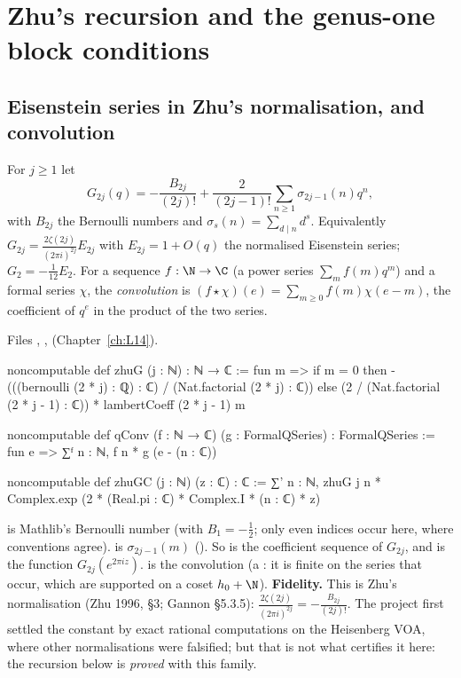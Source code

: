 \section{Zhu's recursion and the genus-one block conditions}\label{l15:sec:recursion}

\subsection{Eisenstein series in Zhu's normalisation, and convolution}

\begin{definition}\label{l15:def:zhuG}
For $j\ge1$ let
\begin{equation*}
  G_{2j}(q)=-\frac{B_{2j}}{(2j)!}+\frac{2}{(2j-1)!}\sum_{n\ge1}\sigma_{2j-1}(n)q^n,
\end{equation*}
with $B_{2j}$ the Bernoulli numbers and $\sigma_s(n)=\sum_{d\mid n}d^s$. Equivalently $G_{2j}=\frac{2\zeta(2j)}{(2\pi i)^{2j}}E_{2j}$
with $E_{2j}=1+O(q)$ the normalised Eisenstein series; $G_2=-\frac1{12}E_2$. For a sequence $f:\N\to\C$ (a power series
$\sum_m f(m)q^m$) and a formal series $\chi$, the \emph{convolution} is $(f\star\chi)(e)=\sum_{m\ge0}f(m)\chi(e-m)$, the
coefficient of $q^e$ in the product of the two series.
\end{definition}
\noindent Files ,
, 
(Chapter~\ref{ch:L14}).
\begin{leancode}
noncomputable def zhuG (j : ℕ) : ℕ → ℂ :=
  fun m =>
    if m = 0 then -(((bernoulli (2 * j) : ℚ) : ℂ) / (Nat.factorial (2 * j) : ℂ))
    else (2 / (Nat.factorial (2 * j - 1) : ℂ)) * lambertCoeff (2 * j - 1) m

noncomputable def qConv (f : ℕ → ℂ) (g : FormalQSeries) : FormalQSeries :=
  fun e => ∑ᶠ n : ℕ, f n * g (e - (n : ℂ))

noncomputable def zhuGC (j : ℕ) (z : ℂ) : ℂ :=
  ∑' n : ℕ, zhuG j n * Complex.exp (2 * (Real.pi : ℂ) * Complex.I * (n : ℂ) * z)
\end{leancode}

\begin{dictionary}
 is Mathlib's Bernoulli number (with $B_1=-\frac12$; only even indices occur here, where conventions
agree).  is $\sigma_{2j-1}(m)$ (). So  is the
coefficient sequence of $G_{2j}$, and  is the function $G_{2j}(e^{2\pi iz})$.  is the
convolution (a : it is finite on the series that occur, which are supported on a coset $h_0+\N$).
\textbf{Fidelity.} This is Zhu's normalisation (Zhu 1996, \S3; Gannon \S5.3.5): $\frac{2\zeta(2j)}{(2\pi i)^{2j}}=-\frac{B_{2j}}{(2j)!}$.
The project first settled the constant by exact rational computations on the Heisenberg VOA, where other normalisations
were falsified; but that is not what certifies it here: the recursion below is \emph{proved} with this family.
\end{dictionary}

